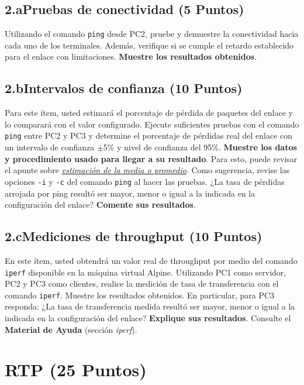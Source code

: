 \documentclass[letterpaper,12pt]{article}
\begin{document}
\subsection*{2.a\quad Pruebas de conectividad (5 Puntos)}

Utilizando el comando \texttt{ping} desde PC2, pruebe y demuestre la conectividad hacia cada uno de los terminales. Además, verifique si se cumple el retardo establecido para el enlace con limitaciones. \textbf{Muestre los resultados obtenidos}.

\subsection*{2.b\quad Intervalos de confianza (10 Puntos)}

Para este ítem, usted estimará el porcentaje de pérdida de paquetes del enlace y lo comparará con el valor configurado. Ejecute suficientes pruebas con el comando \texttt{ping} entre PC2 y PC3 y determine el porcentaje de pérdidas real del enlace con un intervalo de confianza $\pm$5\% y nivel de confianza del 95\%. \textbf{Muestre los datos y procedimiento usado para llegar a su resultado}. Para esto, puede revisar el apunte sobre \href{https://profesores.elo.utfsm.cl/~agv/elo323.ipd438/2s26/Assignment/onLinkLossEstimation_2026.pdf}{\textit{estimación de la media o promedio}}. Como sugerencia, revise las opciones \texttt{-i} y \texttt{-c} del comando \texttt{ping} al hacer las pruebas. ¿La tasa de pérdidas arrojada por ping resultó ser mayor, menor o igual a la indicada en la configuración del enlace? \textbf{Comente sus resultados}.

\subsection*{2.c\quad Mediciones de throughput (10 Puntos)}

En este ítem, usted obtendrá un valor real de throughput por medio del comando \texttt{iperf} disponible en la máquina virtual Alpine. Utilizando PC1 como servidor, PC2 y PC3 como clientes, realice la medición de tasa de transferencia con el comando \texttt{iperf}. Muestre los resultados obtenidos. En particular, para PC3 responda: ¿La tasa de transferencia medida resultó ser mayor, menor o igual a la indicada en la configuración del enlace? \textbf{Explique sus resultados}. Consulte el \textbf{Material de Ayuda} (sección \textit{iperf}).

\section{RTP (25 Puntos)}
\end{document}

